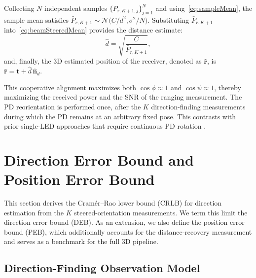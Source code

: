\documentclass[journal]{IEEEtran}
\newcommand{\added}[1]{{\color{blue}#1}}
\begin{document}
Collecting \(N\) independent samples \(\{P_{r,K+1,j}\}_{j=1}^{N}\) and
using~\eqref{eq:sampleMean}, the sample mean satisfies
\(\bar P_{r,K+1}\sim\mathcal{N}\bigl(C/d^{2},\sigma^{2}/N\bigr)\).
Substituting \(\bar P_{r,K+1}\) into~\eqref{eq:beamSteeredMean} provides the distance estimate:
\begin{equation}
\hat d = \sqrt{\frac{C}{\bar P_{r,K+1}}},
\label{eq:dhat}
\end{equation}
and, finally, the 3D estimated position of the receiver, denoted as \(\hat{\mathbf{r}}\), is
$\hat{\mathbf{r}} = \mathbf{t} + \hat d \,\hat{\mathbf{n}}_{d}$.

\added{ This cooperative alignment maximizes both $\cos\phi\approx 1$ and $\cos\psi\approx 1$, thereby maximizing the received power and the SNR of the ranging measurement.
The PD reorientation is performed once, after the $K$ direction-finding measurements during which the PD remains at an arbitrary fixed pose. This contrasts with prior single-LED approaches that require continuous PD rotation \cite{Liu2022,Wang2024,Shi2025}.}

\section{Direction Error Bound and Position Error Bound}
\label{sec:PEB}

\added{This section derives the Cramér--Rao lower bound (CRLB) for direction estimation from the $K$ steered-orientation measurements. We term this limit the direction error bound (DEB). As an extension, we also define the position error bound (PEB), which additionally accounts for the distance-recovery measurement and serves as a benchmark for the full 3D pipeline.}

\subsection{Direction-Finding Observation Model}
\end{document}
